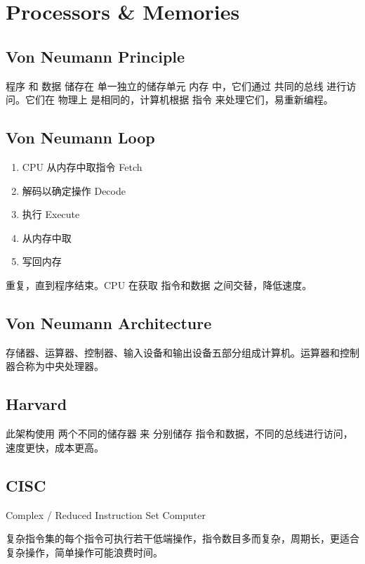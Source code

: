\documentclass[11pt,journal,compsoc]{IEEEtran}
\begin{document}
\section{Processors \& Memories}


\subsection{Von Neumann Principle}

程序 和 数据 储存在 单一独立的储存单元 内存 中，它们通过 共同的总线 进行访问。它们在 物理上 是相同的，计算机根据 指令 来处理它们，易重新编程。


\subsection{Von Neumann Loop}

\begin{enumerate}
    \item CPU 从内存中取指令 Fetch
    \item 解码以确定操作 Decode
    \item 执行 Execute
    \item 从内存中取
    \item 写回内存
\end{enumerate}

重复，直到程序结束。CPU 在获取 指令和数据 之间交替，降低速度。


\subsection{Von Neumann Architecture}

存储器、运算器、控制器、输入设备和输出设备五部分组成计算机。运算器和控制器合称为中央处理器。


\subsection{Harvard}

此架构使用 两个不同的储存器 来 分别储存 指令和数据，不同的总线进行访问，速度更快，成本更高。


\subsection{CISC}

Complex / Reduced Instruction Set Computer

复杂指令集的每个指令可执行若干低端操作，指令数目多而复杂，周期长，更适合复杂操作，简单操作可能浪费时间。
\end{document}

